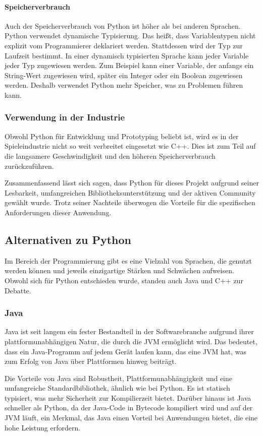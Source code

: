 \paragraph{Speicherverbrauch}
Auch der Speicherverbrauch von Python ist höher als bei anderen Sprachen.
Python verwendet dynamische Typisierung. Das heißt, dass Variablentypen nicht explizit vom Programmierer deklariert werden. 
Stattdessen wird der Typ zur Laufzeit bestimmt. In einer dynamisch typisierten Sprache kann jeder Variable jeder Typ zugewiesen werden. 
Zum Beispiel kann einer Variable, der anfangs ein String-Wert zugewiesen wird, später ein Integer oder ein Boolean zugewiesen werden.
Deshalb verwendet Python mehr Speicher, was zu Problemen führen kann.

\subsubsection{Verwendung in der Industrie}
Obwohl Python für Entwicklung und Prototyping beliebt ist, wird es in der Spieleindustrie nicht so weit verbreitet eingesetzt wie C++. 
Dies ist zum Teil auf die langsamere Geschwindigkeit und den höheren Speicherverbrauch zurückzuführen.

Zusammenfassend lässt sich sagen, dass Python für dieses Projekt aufgrund seiner Lesbarkeit, 
umfangreichen Bibliotheksunterstützung und der aktiven Community gewählt wurde. 
Trotz seiner Nachteile überwogen die Vorteile für die spezifischen Anforderungen dieser Anwendung.

\subsection{Alternativen zu Python}
Im Bereich der Programmierung gibt es eine Vielzahl von Sprachen, die genutzt werden können und jeweils 
einzigartige Stärken und Schwächen aufweisen. Obwohl sich für Python entschieden wurde, standen auch Java und C++
zur Debatte.

\subsubsection{Java}
Java ist seit langem ein fester Bestandteil in der Softwarebranche aufgrund ihrer plattformunabhängigen Natur, die durch die \ac{JVM} ermöglicht wird. 
Das bedeutet, dass ein Java-Programm auf jedem Gerät laufen kann, das eine \ac{JVM} hat, was zum Erfolg von Java über Plattformen hinweg beiträgt.

Die Vorteile von Java sind Robustheit, Plattformunabhängigkeit und eine umfangreiche Standardbibliothek, ähnlich wie bei Python. 
Es ist statisch typisiert, was mehr Sicherheit zur Kompilierzeit bietet. Darüber hinaus ist Java schneller als Python, da der Java-Code in 
Bytecode kompiliert wird und auf der \ac{JVM} läuft, ein Merkmal, das Java einen Vorteil bei Anwendungen bietet, die eine hohe Leistung erfordern.

